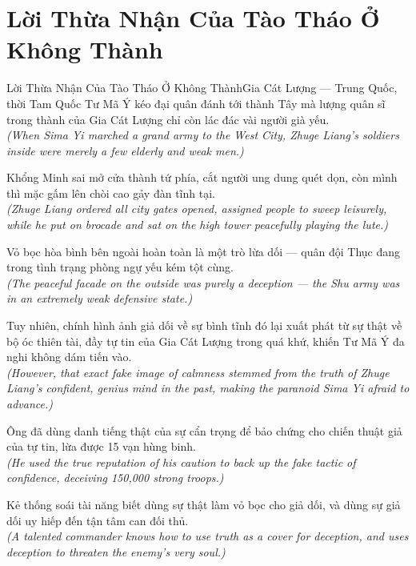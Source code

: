 \section{Lời Thừa Nhận Của Tào Tháo Ở Không Thành}
\begin{truyen}{Lời Thừa Nhận Của Tào Tháo Ở Không Thành}{Gia Cát Lượng --- Trung Quốc, thời Tam Quốc}
 Tư Mã Ý kéo đại quân đánh tới thành Tây mà lượng quân sĩ trong thành của Gia Cát Lượng chỉ còn lác đác vài người già yếu.\\[4pt]
\textit{(When Sima Yi marched a grand army to the West City, Zhuge Liang's soldiers inside were merely a few elderly and weak men.)}

Khổng Minh sai mở cửa thành tứ phía, cắt người ung dung quét dọn, còn mình thì mặc gấm lên chòi cao gảy đàn tĩnh tại.\\[4pt]
\textit{(Zhuge Liang ordered all city gates opened, assigned people to sweep leisurely, while he put on brocade and sat on the high tower peacefully playing the lute.)}

Vỏ bọc hòa bình bên ngoài hoàn toàn là một trò lừa dối --- quân đội Thục đang trong tình trạng phòng ngự yếu kém tột cùng.\\[4pt]
\textit{(The peaceful facade on the outside was purely a deception --- the Shu army was in an extremely weak defensive state.)}

Tuy nhiên, chính hình ảnh giả dối về sự bình tĩnh đó lại xuất phát từ sự thật về bộ óc thiên tài, đầy tự tin của Gia Cát Lượng trong quá khứ, khiến Tư Mã Ý đa nghi không dám tiến vào.\\[4pt]
\textit{(However, that exact fake image of calmness stemmed from the truth of Zhuge Liang's confident, genius mind in the past, making the paranoid Sima Yi afraid to advance.)}

Ông đã dùng danh tiếng thật của sự cẩn trọng để bảo chứng cho chiến thuật giả của tự tin, lừa được 15 vạn hùng binh.\\[4pt]
\textit{(He used the true reputation of his caution to back up the fake tactic of confidence, deceiving 150,000 strong troops.)}

\end{truyen}
\begin{baihoc}
  Kẻ thống soái tài năng biết dùng sự thật làm vỏ bọc cho giả dối, và dùng sự giả dối uy hiếp đến tận tâm can đối thủ.\\[4pt]
  \textit{(A talented commander knows how to use truth as a cover for deception, and uses deception to threaten the enemy's very soul.)}
\end{baihoc}

